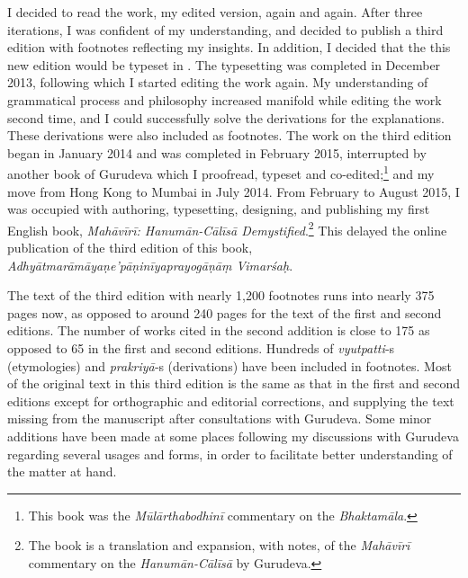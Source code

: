 \begin{sloppypar}\justifying\noindent\hspace{10mm} {\engtextfont I decided to read the work, my edited version, again and again. After three iterations, I was confident of my understanding, and decided to publish a third edition with footnotes reflecting my insights. In addition, I decided that the this new edition would be typeset in \XeLaTeX{}. The typesetting was completed in December 2013, following which I started editing the work again. My understanding of grammatical process and philosophy increased manifold while editing the work second time, and I could successfully solve the derivations for the explanations. These derivations were also included as footnotes. The work on the third edition began in January 2014 and was completed in February 2015, interrupted by another book of Gurudeva which I proofread, typeset and co-edited;\footnote{{\engtextfont This book was the \textit{Mūlārthabodhinī} commentary on the \textit{Bhaktamāla}.}} and my move from Hong Kong to Mumbai in July 2014. From February to August 2015, I was occupied with authoring, typesetting, designing, and publishing my first English book, \textit{Mahāvīrī: Hanumān-Cālīsā Demystified}.\footnote{{\engtextfont The book is a translation and expansion, with notes, of the \textit{Mahāvīrī} commentary on the \textit{Hanumān-Cālīsā} by Gurudeva.}} This delayed the online publication of the third edition of this book, \textit{Adhyātmarāmāyaṇe’\-pāṇinīya\-prayogāṇāṃ Vimarśaḥ}.}\end{sloppypar}
\begin{sloppypar}\justifying\noindent\hspace{10mm} {\engtextfont The text of the third edition with nearly 1,200 footnotes runs into nearly 375 pages now, as opposed to around 240 pages for the text of the first and second editions. The number of works cited in the second addition is close to 175 as opposed to 65 in the first and second editions. Hundreds of \textit{vyutpatti}‑s (etymologies) and \textit{prakriyā}‑s (derivations) have been included in footnotes. Most of the original text in this third edition is the same as that in the first and second editions except for orthographic and editorial corrections, and supplying the text missing from the manuscript after consultations with Gurudeva. Some minor additions have been made at some places following my discussions with Gurudeva regarding several usages and forms, in order to facilitate better understanding of the matter at hand.}\end{sloppypar}
